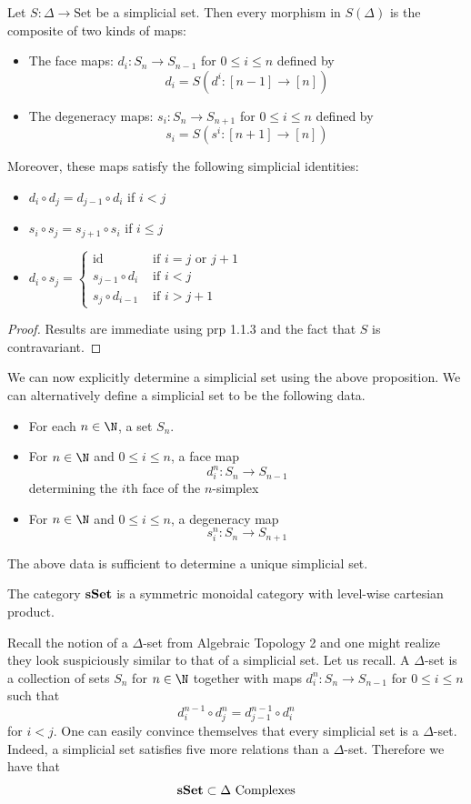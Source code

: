 \documentclass[a4paper]{article}
\begin{document}
\begin{prp}{}{} Let $S:\Delta\to\text{Set}$ be a simplicial set. Then every morphism in $S(\Delta)$ is the composite of two kinds of maps: 
\begin{itemize}
\item The face maps: $d_i:S_n\to S_{n-1}$ for $0\leq i\leq n$ defined by $$d_i=S(d^i:[n-1]\to[n])$$
\item The degeneracy maps: $s_i:S_n\to S_{n+1}$ for $0\leq i\leq n$ defined by $$s_i=S(s^i:[n+1]\to[n])$$
\end{itemize}
Moreover, these maps satisfy the following simplicial identities: 
\begin{itemize}
\item $d_i\circ d_j=d_{j-1}\circ d_i$ if $i<j$
\item $s_i\circ s_j=s_{j+1}\circ s_i$ if $i\leq j$
\item $d_i\circ s_j=\begin{cases}
\text{id} & \text{ if } i=j\text{ or }j+1\\
s_{j-1}\circ d_i & \text{ if } i<j\\
s_j\circ d_{i-1} & \text{ if }i>j+1
\end{cases}$
\end{itemize} \tcbline
\begin{proof}
Results are immediate using prp 1.1.3 and the fact that $S$ is contravariant. 
\end{proof}
\end{prp}

We can now explicitly determine a simplicial set using the above proposition. We can alternatively define a simplicial set to be the following data. 
\begin{itemize}
\item For each $n\in\N$, a set $S_n$. 
\item For $n\in\N$ and $0\leq i\leq n$, a face map $$d_i^n:S_n\to S_{n-1}$$ determining the $i$th face of the $n$-simplex
\item For $n\in\N$ and $0\leq i\leq n$, a degeneracy map $$s_i^n:S_n\to S_{n+1}$$
\end{itemize}

The above data is sufficient to determine a unique simplicial set. 

\begin{prp}{}{} The category $\bold{sSet}$ is a symmetric monoidal category with level-wise cartesian product. 
\end{prp}

Recall the notion of a $\Delta$-set from Algebraic Topology 2 and one might realize they look suspiciously similar to that of a simplicial set. Let us recall. A $\Delta$-set is a collection of sets $S_n$ for $n\in\N$ together with maps $d_i^n:S_n\to S_{n-1}$ for $0\leq i\leq n$ such that $$d_i^{n-1}\circ d_j^n=d_{j-1}^{n-1}\circ d_i^n$$ for $i<j$. One can easily convince themselves that every simplicial set is a $\Delta$-set. Indeed, a simplicial set satisfies five more relations than a $\Delta$-set. Therefore we have that $$\bold{sSet}\subset\Delta\text{ Complexes}$$
\end{document}
